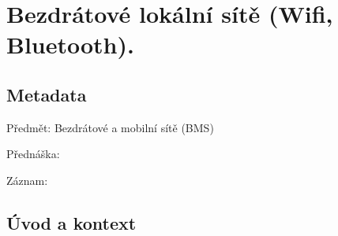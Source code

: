 

\chapter{Bezdrátové lokální sítě (Wifi, Bluetooth).}


\section{Metadata}

\begin{compactitem}
    \item Předmět: Bezdrátové a mobilní sítě (BMS)
    \item Přednáška:
    \begin{compactitem}
        \item {}
    \end{compactitem}
    \item Záznam:
    \begin{compactitem}
        \item {}
    \end{compactitem}
\end{compactitem}


\section{Úvod a kontext}


